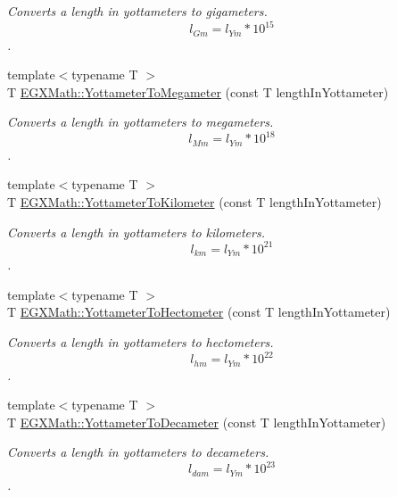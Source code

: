 \begin{DoxyCompactItemize}
\begin{DoxyCompactList}\small\item\em Converts a length in yottameters to gigameters. \[ l_{Gm}=l_{Ym} * 10^{15} \]. \end{DoxyCompactList}\item 
{\footnotesize template$<$typename T $>$ }\\T \mbox{\hyperlink{group___e_g_x_math-_conversions-_length_conversions-_s_i-_yottameter-_s_i_ga6c00035c9e60ba95c4670d34aef3ec2a}{E\+G\+X\+Math\+::\+Yottameter\+To\+Megameter}} (const T length\+In\+Yottameter)
\begin{DoxyCompactList}\small\item\em Converts a length in yottameters to megameters. \[ l_{Mm}=l_{Ym} * 10^{18} \]. \end{DoxyCompactList}\item 
{\footnotesize template$<$typename T $>$ }\\T \mbox{\hyperlink{group___e_g_x_math-_conversions-_length_conversions-_s_i-_yottameter-_s_i_ga3de441b3e33fe175b75425711d1b92e1}{E\+G\+X\+Math\+::\+Yottameter\+To\+Kilometer}} (const T length\+In\+Yottameter)
\begin{DoxyCompactList}\small\item\em Converts a length in yottameters to kilometers. \[ l_{km}=l_{Ym} * 10^{21} \]. \end{DoxyCompactList}\item 
{\footnotesize template$<$typename T $>$ }\\T \mbox{\hyperlink{group___e_g_x_math-_conversions-_length_conversions-_s_i-_yottameter-_s_i_ga3c7aed6e299bc4f0288d0672a7262320}{E\+G\+X\+Math\+::\+Yottameter\+To\+Hectometer}} (const T length\+In\+Yottameter)
\begin{DoxyCompactList}\small\item\em Converts a length in yottameters to hectometers. \[ l_{hm}=l_{Ym} * 10^{22} \]. \end{DoxyCompactList}\item 
{\footnotesize template$<$typename T $>$ }\\T \mbox{\hyperlink{group___e_g_x_math-_conversions-_length_conversions-_s_i-_yottameter-_s_i_gadb4ab7fb7c1091124160d66ace6439a3}{E\+G\+X\+Math\+::\+Yottameter\+To\+Decameter}} (const T length\+In\+Yottameter)
\begin{DoxyCompactList}\small\item\em Converts a length in yottameters to decameters. \[ l_{dam}=l_{Ym} * 10^{23} \]. \end{DoxyCompactList}\item 

\end{DoxyCompactItemize}
